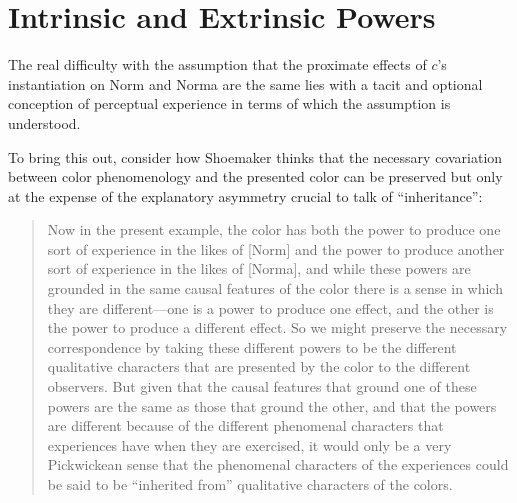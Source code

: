 \documentclass[12pt]{article}
\begin{document}

\section{Intrinsic and Extrinsic Powers}\label{sec:intrinsic_and_extrinsic_powers} 

The real difficulty with the assumption that the proximate effects of $c$'s instantiation on Norm and Norma are the same lies with a tacit and optional conception of perceptual experience in terms of which the assumption is understood. 

To bring this out, consider how Shoemaker thinks that the necessary covariation between color phenomenology and the presented color can be preserved but only at the expense of the explanatory asymmetry crucial to talk of ``inheritance'': 
\begin{quote}
	Now in the present example, the color has both the power to produce one sort of experience in the likes of [Norm] and the power to produce another sort of experience in the likes of [Norma], and while these powers are grounded in the same causal features of the color there is a sense in which they are different---one is a power to produce one effect, and the other is the power to produce a different effect. So we might preserve the necessary correspondence by taking these different powers to be the different qualitative characters that are presented by the color to the different observers. But given that the causal features that ground one of these powers are the same as those that ground the other, and that the powers are different because of the different phenomenal characters that experiences have when they are exercised, it would only be a very Pickwickean sense that the phenomenal characters of the experiences could be said to be ``inherited from'' qualitative characters of the colors. \citep[476, n. 8]{Shoemaker:2006vn} 
\end{quote}
\end{document}
